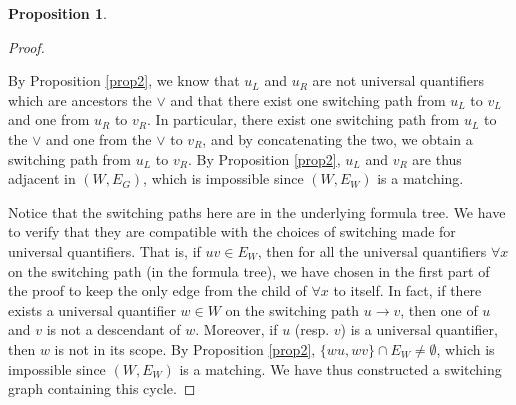 \documentclass[conference,twosided,10pt]{IEEEtran}
\theoremstyle{definition}
\newtheorem{proposition}[thm]{Proposition}
\newcommand{\cor}{\vee}
\begin{document}
\begin{proposition}
\begin{proof}
\begin{itemize}
    By Proposition \ref{prop2}, we know that $u_L$ and $u_R$ are not
	universal quantifiers which are ancestors the $\cor$
	and that there exist one switching path from $u_L$ to $v_L$ and one
	from $u_R$ to $v_R$. In particular, there exist one switching path from
	$u_L$ to the $\cor$ and one from the $\cor$ to $v_R$, and by
	concatenating the two, we obtain a switching path from $u_L$ to $v_R$. 
	By Proposition \ref{prop2}, $u_L$ and $v_R$ are thus adjacent in $(W,
	E_G)$, which is impossible since $(W, E_W)$ is a matching.
  \end{itemize}
  Notice that the switching paths here are in the underlying formula tree. We
  have to verify that they are compatible with the choices of switching made for
  universal quantifiers. That is, if $uv \in E_W$, then for all the
  universal quantifiers $\forall x$ on the switching path (in the formula
	tree), we have chosen in the first part of the proof to keep the only
	edge from the child of $\forall x$ to itself. In fact, if there exists
	a universal quantifier $w \in W$ on the switching path $u \rightarrow
	v$, then one of $u$ and $v$ is not a descendant of $w$. Moreover, if
	$u$ (resp. $v$) is a universal quantifier, then $w$ is not in its scope.
	By Proposition \ref{prop2}, $\{wu, wv\} \cap E_W \neq \emptyset$, which
	is impossible since $(W, E_W)$ is a matching.
  We have thus constructed a switching graph containing this cycle.
\end{proof}
\end{proposition}
\end{document}
